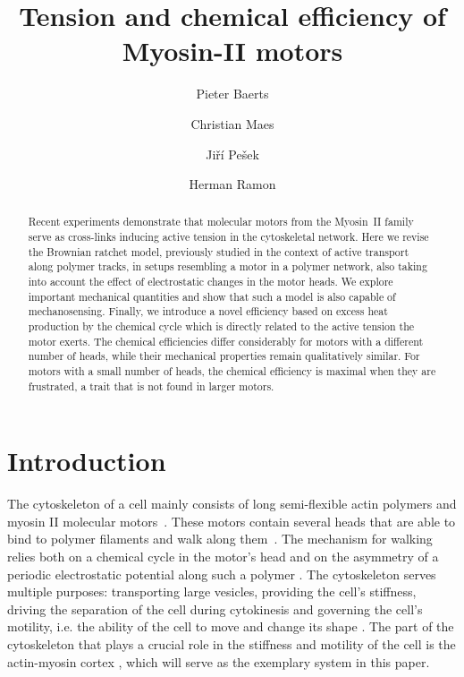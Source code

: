 \documentclass[aps,pre,twocolumn,showpacs,showkeys,superscriptaddress,floatfix]{revtex4-1}
\begin{document}
 

\title{Tension and chemical efficiency of Myosin-II motors}
\author{Pieter Baerts}
\author{Christian Maes}
\author{Jiří Pešek}
\author{Herman Ramon}


\begin{abstract}
Recent experiments demonstrate that molecular motors from the Myosin~II family serve as cross-links inducing active tension in the cytoskeletal network.  
Here we revise the Brownian ratchet model, 
previously studied in the context of active transport along polymer tracks, in setups resembling a motor in a polymer network, also taking into account the effect of electrostatic changes in the motor heads. 
We explore important mechanical quantities and show that such a model is also capable of mechanosensing. 
Finally, we introduce a novel efficiency based on excess heat production by the chemical cycle which is directly related to the active tension the motor exerts. 
The chemical efficiencies differ considerably for motors with a different number of heads, while their mechanical properties remain qualitatively similar. 
For motors with a small number of heads, the chemical efficiency is maximal when they are frustrated, a trait that is not found in larger motors. 
\end{abstract}

\maketitle 

\section{Introduction}
The cytoskeleton of a cell mainly consists of long semi-flexible actin polymers and myosin II molecular motors~\cite{mitchison1996actin}. 
These motors contain several heads that are able to bind to polymer filaments and walk along them~\cite{pollard1982structure}. 
The mechanism for walking relies both on a chemical cycle in the motor's head and on the asymmetry of a periodic electrostatic potential along such a polymer \cite{Reimann2002introduction}. 
The cytoskeleton serves multiple purposes: 
transporting large vesicles, providing the cell's stiffness, driving the separation of the cell during cytokinesis and governing the cell's motility, i.e. the ability of the cell to move and change its shape \cite{ross2008cargo,mitchison1996actin,rosenblatt2004myosin}.
The part of the cytoskeleton that plays a crucial role in the stiffness and motility of the cell is the actin-myosin cortex \cite{vicente2009non}, which will serve as the exemplary system in this paper.
\end{document}
